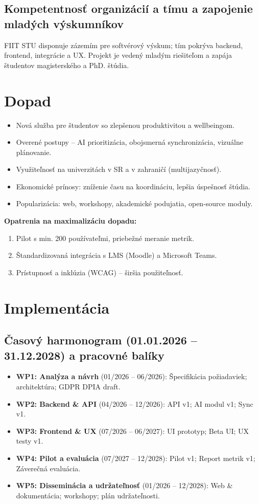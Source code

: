 \documentclass[11pt,a4paper]{article}
\begin{document}
\subsection{Kompetentnosť organizácií a tímu a zapojenie mladých výskumníkov}
FIIT STU disponuje zázemím pre softvérový výskum; tím pokrýva backend, frontend, integrácie a UX.
Projekt je vedený mladým riešiteľom a zapája študentov magisterského a PhD. štúdia.

\section{Dopad}
\begin{itemize}
\item Nová služba pre študentov so zlepšenou produktivitou a wellbeingom.
\item Overené postupy – AI prioritizácia, obojsmerná synchronizácia, vizuálne plánovanie.
\item Využiteľnosť na univerzitách v SR a v zahraničí (multijazyčnosť).
\item Ekonomické prínosy: zníženie času na koordináciu, lepšia úspešnosť štúdia.
\item Popularizácia: web, workshopy, akademické podujatia, open-source moduly.
\end{itemize}

\noindent\textbf{Opatrenia na maximalizáciu dopadu:}
\begin{enumerate}
\item Pilot s min. 200 používateľmi, priebežné meranie metrik.
\item Štandardizovaná integrácia s LMS (Moodle) a Microsoft Teams.
\item Prístupnosť a inklúzia (WCAG) – širšia použiteľnosť.
\end{enumerate}

\section{Implementácia}
\subsection{Časový harmonogram (01.01.2026 – 31.12.2028) a pracovné balíky}
\begin{itemize}
\item \textbf{WP1: Analýza a návrh} (01/2026 – 06/2026): Špecifikácia požiadaviek; architektúra; GDPR DPIA draft.
\item \textbf{WP2: Backend \& API} (04/2026 – 12/2026): API v1; AI modul v1; Sync v1.
\item \textbf{WP3: Frontend \& UX} (07/2026 – 06/2027): UI prototyp; Beta UI; UX testy v1.
\item \textbf{WP4: Pilot a evaluácia} (07/2027 – 12/2028): Pilot v1; Report metrik v1; Záverečná evaluácia.
\item \textbf{WP5: Disseminácia a udržateľnosť} (01/2026 – 12/2028): Web \& dokumentácia; workshopy; plán udržateľnosti.
\end{itemize}
\end{document}
